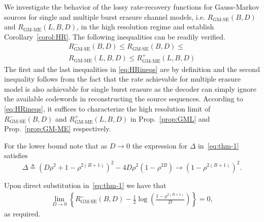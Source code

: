 \documentclass[journal, twocolumn, 10pt]{IEEEtran}
\begin{document}
{We investigate the behavior of the lossy rate-recovery functions for Gauss-Markov sources for single and multiple burst erasure channel models, i.e. $R_{\textrm{GM-SE}}(B,D)$ and $R_{\textrm{GM-ME}}(L,B,D)$, in the high resolution regime and establish Corollary~\ref{corol:HR}. The following inequalities can be readily verified.
\begin{multline}
R^{-}_{\textrm{GM-SE}}(B,D) \le R_{\textrm{GM-SE}}(B,D) \le  \\ R_{\textrm{GM-ME}}(L,B,D) \le R^{+}_{\textrm{GM-ME}}(L,B,D) \label{eq:HRineqs}
\end{multline} The first and the last inequalities in \eqref{eq:HRineqs} are by definition and the second inequality follows from the fact that the rate achievable for multiple erasure model is also achievable for single burst erasure as the decoder can simply ignore the available codewords in reconstructing the source sequences.  According to \eqref{eq:HRineqs}, it suffices to characterize the high resolution limit of $R^{-}_{\textrm{GM-SE}}(B,D)$ and $R^{+}_{\textrm{GM-ME}}(L,B,D)$ in Prop.~\ref{prop:GML} and Prop.~\ref{prop:GM-ME} respectively. 


For the lower bound note that as $D \rightarrow 0$ the expression for $\Delta$ in~\eqref{eq:thm-1} satisfies
$$\Delta \triangleq (D\rho^2+1-\rho^{2(B+1)})^2 - 4D\rho^2(1-\rho^{2B}) \rightarrow (1-\rho^{2(B+1)})^2.$$

Upon direct substitution in~\eqref{eq:thm-1} we have that
\begin{align}
\lim_{D\to 0} \left\{R^{-}_{\textrm{GM-SE}}(B,D) - \frac{1}{2} \log \left(\frac{1-\rho^{2(B+1)}}{D}\right)\right\} = 0, \label{hrl}
\end{align} as required. 



}
\end{document}
